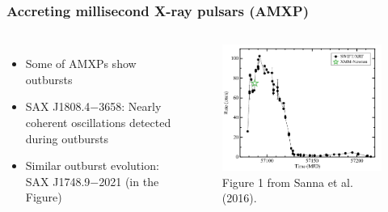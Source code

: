 \documentclass{beamer}
\begin{document}
\begin{frame}
\frametitle{Accreting millisecond X-ray pulsars (AMXP)}
\begin{columns}[c] %

\begin{itemize}
\item Some of AMXPs show outbursts
\item SAX J1808.4$-$3658: Nearly coherent oscillations detected during outbursts
\item Similar outburst evolution: SAX J1748.9$-$2021 (in the Figure)

\end{itemize}


\begin{figure}
\includegraphics[width=1.1\linewidth]{outburst.png}
\caption{Figure 1 from Sanna et al. (2016).}
\end{figure}

\end{columns}
\end{frame}


\end{document}
